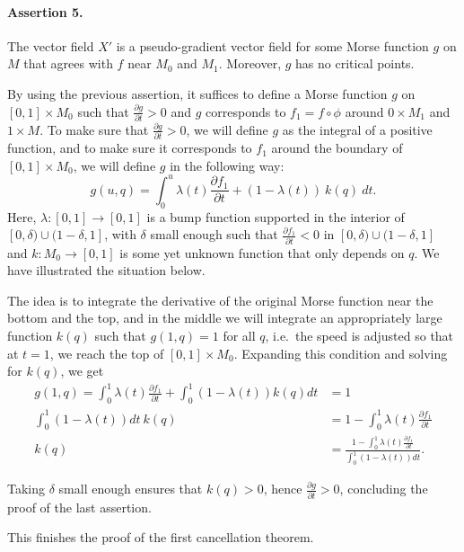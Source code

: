 \begin{myproof}
\paragraph{Assertion 5.}
The vector field $X'$ is a pseudo-gradient vector field for some Morse function  $g$ on $M$ that agrees with $f$ near  $M_0$ and $M_1$.
Moreover, $g$ has no critical points.
\begin{myproof}
    By using the previous assertion,
    it suffices to define a Morse function $g$ on $[0, 1] \times M_0$ such that $\frac{\partial g}{\partial t} > 0$ and $g$ corresponds to  $ f_1 = f  \circ  \phi$ around $0 \times M_1$ and $1 \times M$.
    To make sure that $\frac{\partial g}{\partial t} > 0$, we will define $g$ as the integral of a positive function,
    and to make sure it corresponds to $f_1$ around the boundary of $[0,1] \times M_0$, we will define $g$ in the following way:
     \[
         g(u, q) = \int_0^{u} \lambda(t) \frac{\partial f_1}{\partial t} + (1-\lambda(t))\: k(q) \: dt
    .\] 
    Here, $\lambda: [0,1] \to  [0,1]$ is a bump function supported in the interior of $[0, \delta) \cup (1-\delta, 1]$, with $\delta$ small enough such that $\frac{\partial f_1}{\partial t}<0$ in $[0, \delta) \cup (1-\delta, 1]$ and $k: M_0 \to [0,1]$ is some yet unknown function that only depends on $q$.
    We have illustrated the situation below.
    \begin{figure}[H]
        \centering
    \end{figure}

    The idea is to integrate the derivative of the original Morse function near the bottom and the top, and in the middle we will integrate an appropriately large function $k(q)$ such that  $g(1, q) = 1$ for all $q$, i.e.\ the speed is adjusted so that at $t=1$, we reach the top of $[0,1] \times M_0$.
    Expanding this condition and solving for $k(q)$, we get
     \begin{align*}
         g(1, q) = \int_{0}^{1} \lambda(t) \frac{\partial f_1}{\partial t}  + \int_{0}^{1}  (1-\lambda(t)) k(q) dt &= 1\\
          \int_{0}^{1}  (1-\lambda(t))  dt \  k(q)&= 1 - \int_{0}^{1} \lambda(t) \frac{\partial f_1}{\partial t}\\
          k(q)&= \frac{1 - \int_{0}^{1} \lambda(t) \frac{\partial f_1}{\partial t}}{\int_{0}^{1}  (1-\lambda(t))  dt}
    .\end{align*} 

    Taking $\delta$ small enough ensures that  $k(q) > 0$, hence $\frac{\partial g}{\partial t}>0$, concluding the proof of the last assertion.
\end{myproof}

This finishes the proof of the first cancellation theorem.
\renewcommand{\qedsymbol}{\ensuremath{\square}}
\end{myproof}

